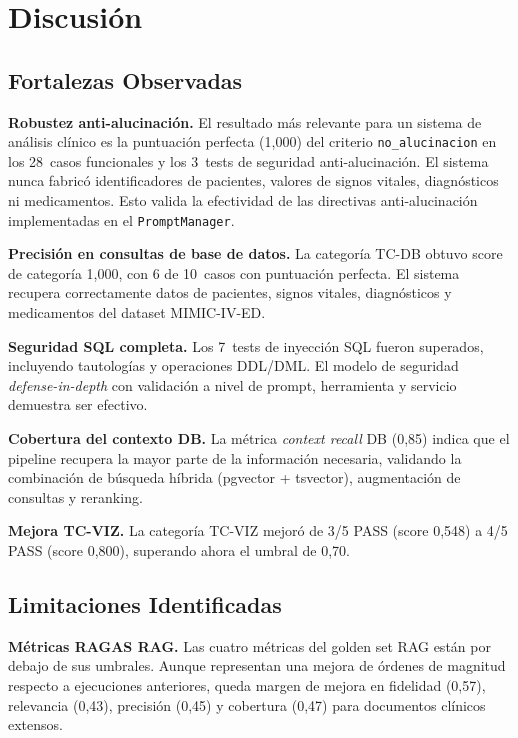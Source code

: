 \documentclass[11pt,a4paper,twocolumn]{article}
\begin{document}
\section{Discusi\'{o}n}
\label{sec:discusion}

\subsection{Fortalezas Observadas}

\textbf{Robustez anti-alucinaci\'{o}n.} El resultado m\'{a}s relevante para un sistema de an\'{a}lisis cl\'{i}nico es la puntuaci\'{o}n perfecta (1,000) del criterio \texttt{no\_alucinacion} en los 28~casos funcionales y los 3~tests de seguridad anti-alucinaci\'{o}n. El sistema nunca fabric\'{o} identificadores de pacientes, valores de signos vitales, diagn\'{o}sticos ni medicamentos. Esto valida la efectividad de las directivas anti-alucinaci\'{o}n implementadas en el \texttt{PromptManager}.

\textbf{Precisi\'{o}n en consultas de base de datos.} La categor\'{i}a TC-DB obtuvo score de categor\'{i}a 1,000, con 6 de 10~casos con puntuaci\'{o}n perfecta. El sistema recupera correctamente datos de pacientes, signos vitales, diagn\'{o}sticos y medicamentos del dataset MIMIC-IV-ED.

\textbf{Seguridad SQL completa.} Los 7~tests de inyecci\'{o}n SQL fueron superados, incluyendo tautolog\'{i}as y operaciones DDL/DML. El modelo de seguridad \textit{defense-in-depth} con validaci\'{o}n a nivel de prompt, herramienta y servicio demuestra ser efectivo.

\textbf{Cobertura del contexto DB.} La m\'{e}trica \textit{context recall} DB (0,85) indica que el pipeline recupera la mayor parte de la informaci\'{o}n necesaria, validando la combinaci\'{o}n de b\'{u}squeda h\'{i}brida (pgvector + tsvector), augmentaci\'{o}n de consultas y reranking.

\textbf{Mejora TC-VIZ.} La categor\'{i}a TC-VIZ mejor\'{o} de 3/5 PASS (score 0,548) a 4/5 PASS (score 0,800), superando ahora el umbral de 0,70.

\subsection{Limitaciones Identificadas}

\textbf{M\'{e}tricas RAGAS RAG.} Las cuatro m\'{e}tricas del golden set RAG est\'{a}n por debajo de sus umbrales. Aunque representan una mejora de \'{o}rdenes de magnitud respecto a ejecuciones anteriores, queda margen de mejora en fidelidad (0,57), relevancia (0,43), precisi\'{o}n (0,45) y cobertura (0,47) para documentos cl\'{i}nicos extensos.
\end{document}
